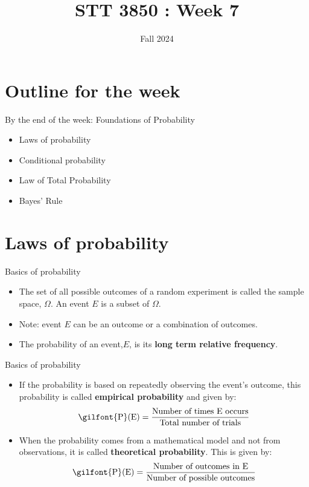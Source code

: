 \documentclass[
  ignorenonframetext,
]{beamer}
\title{STT 3850 : Week 7}
\author{Fall 2024}
\date{}
\institute{Appalachian State University}
\providecommand{\tightlist}{%
  \setlength{\itemsep}{0pt}\setlength{\parskip}{0pt}}
\begin{document}
\frame{\titlepage}

\hypertarget{outline-for-the-week}{%
\section{Outline for the week}\label{outline-for-the-week}}

\begin{frame}{By the end of the week: Foundations of Probability}
\protect\hypertarget{by-the-end-of-the-week-foundations-of-probability}{}
\begin{itemize}
\tightlist
\item
  Laws of probability
\item
  Conditional probability
\item
  Law of Total Probability
\item
  Bayes' Rule
\end{itemize}
\end{frame}

\hypertarget{laws-of-probability}{%
\section{Laws of probability}\label{laws-of-probability}}

\begin{frame}{Basics of probability}
\protect\hypertarget{basics-of-probability}{}
\begin{itemize}
\item
  The set of all possible outcomes of a random experiment is called the
  sample space, \(\Omega\). An event \(E\) is a subset of \(\Omega\).
\item
  Note: event \(E\) can be an outcome or a combination of outcomes.
\item
  The probability of an event,\(E\), is its \textbf{long term relative
  frequency}.
\end{itemize}
\end{frame}

\begin{frame}{Basics of probability}
\protect\hypertarget{basics-of-probability-1}{}
\begin{itemize}
\tightlist
\item
  If the probability is based on repeatedly observing the event's
  outcome, this probability is called \textbf{empirical probability} and
  given by:
  \[\textrm{\gilfont{P}}\normalfont (\text{E})=\frac{\text{Number of times E occurs}}{\text{Total number of trials}}\]
\item
  When the probability comes from a mathematical model and not from
  observations, it is called \textbf{theoretical probability}. This is
  given by:
  \[\textrm{\gilfont{P}}\normalfont (\text{E})=\frac{\text{Number of outcomes in E}}{\text{Number of possible outcomes}}\]
\end{itemize}
\end{frame}
\end{document}

